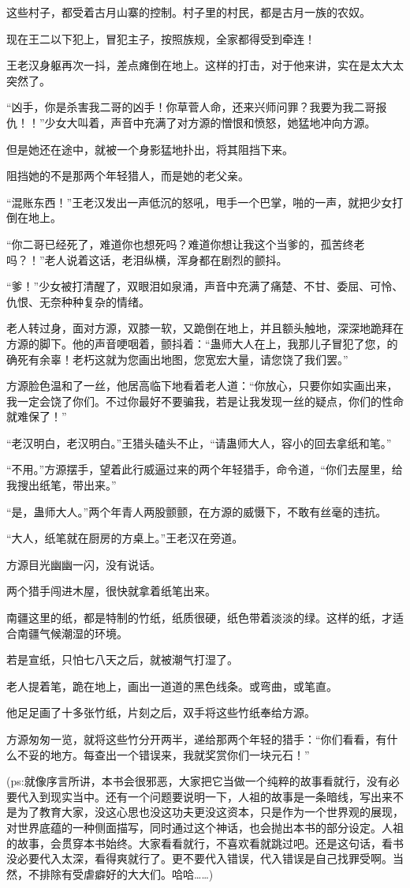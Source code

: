 \begin{this_body}
这些村子，都受着古月山寨的控制。村子里的村民，都是古月一族的农奴。

现在王二以下犯上，冒犯主子，按照族规，全家都得受到牵连！

王老汉身躯再次一抖，差点瘫倒在地上。这样的打击，对于他来讲，实在是太大太突然了。

“凶手，你是杀害我二哥的凶手！你草菅人命，还来兴师问罪？我要为我二哥报仇！！”少女大叫着，声音中充满了对方源的憎恨和愤怒，她猛地冲向方源。

但是她还在途中，就被一个身影猛地扑出，将其阻挡下来。

阻挡她的不是那两个年轻猎人，而是她的老父亲。

“混账东西！”王老汉发出一声低沉的怒吼，甩手一个巴掌，啪的一声，就把少女打倒在地上。

“你二哥已经死了，难道你也想死吗？难道你想让我这个当爹的，孤苦终老吗？！”老人说着这话，老泪纵横，浑身都在剧烈的颤抖。

“爹！”少女被打清醒了，双眼泪如泉涌，声音中充满了痛楚、不甘、委屈、可怜、仇恨、无奈种种复杂的情绪。

老人转过身，面对方源，双膝一软，又跪倒在地上，并且额头触地，深深地跪拜在方源的脚下。他的声音哽咽着，颤抖着：“蛊师大人在上，我那儿子冒犯了您，的确死有余辜！老朽这就为您画出地图，您宽宏大量，请您饶了我们罢。”

方源脸色温和了一丝，他居高临下地看着老人道：“你放心，只要你如实画出来，我一定会饶了你们。不过你最好不要骗我，若是让我发现一丝的疑点，你们的性命就难保了！”

“老汉明白，老汉明白。”王猎头磕头不止，“请蛊师大人，容小的回去拿纸和笔。”

“不用。”方源摆手，望着此行威逼过来的两个年轻猎手，命令道，“你们去屋里，给我搜出纸笔，带出来。”

“是，蛊师大人。”两个年青人两股颤颤，在方源的威慑下，不敢有丝毫的违抗。

“大人，纸笔就在厨房的方桌上。”王老汉在旁道。

方源目光幽幽一闪，没有说话。

两个猎手闯进木屋，很快就拿着纸笔出来。

南疆这里的纸，都是特制的竹纸，纸质很硬，纸色带着淡淡的绿。这样的纸，才适合南疆气候潮湿的环境。

若是宣纸，只怕七八天之后，就被潮气打湿了。

老人提着笔，跪在地上，画出一道道的黑色线条。或弯曲，或笔直。

他足足画了十多张竹纸，片刻之后，双手将这些竹纸奉给方源。

方源匆匆一览，就将这些竹分开两半，递给那两个年轻的猎手：“你们看看，有什么不妥的地方。每查出一个错误来，我就奖赏你们一块元石！”

(ps:就像序言所讲，本书会很邪恶，大家把它当做一个纯粹的故事看就行，没有必要代入到现实当中。还有一个问题要说明一下，人祖的故事是一条暗线，写出来不是为了教育大家，没这心思也没这功夫更没这资本，只是作为一个世界观的展现，对世界底蕴的一种侧面描写，同时通过这个神话，也会抛出本书的部分设定。人祖的故事，会贯穿本书始终。大家看看就行，不喜欢看就跳过吧。还是这句话，看书没必要代入太深，看得爽就行了。更不要代入错误，代入错误是自己找罪受啊。当然，不排除有受虐癖好的大大们。哈哈……)

\end{this_body}

